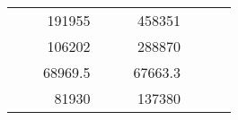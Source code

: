 \begin{table}[H]
\begin{tabular}{|ccrccrccc}
\multicolumn{1}{|c|}{\cellcolor[HTML]{FFFFC7}}                                & \multicolumn{1}{c|}{\cellcolor[HTML]{DDFDFF}}                      & \multicolumn{1}{r|}{\cellcolor[HTML]{DAE8FC}191955}    & \multicolumn{1}{c|}{\cellcolor[HTML]{FFFFC7}}                                & \multicolumn{1}{c|}{\cellcolor[HTML]{DDFDFF}}                       & \multicolumn{1}{r|}{\cellcolor[HTML]{DDFDFF}458351}    &                                                                              &                                                                    &                                                        \\ \cline{3-3} \cline{6-6}
\multicolumn{1}{|c|}{\cellcolor[HTML]{FFFFC7}}                                & \multicolumn{1}{c|}{\cellcolor[HTML]{DDFDFF}}                      & \multicolumn{1}{r|}{\cellcolor[HTML]{DDFDFF}106202}    & \multicolumn{1}{c|}{\cellcolor[HTML]{FFFFC7}}                                & \multicolumn{1}{c|}{\cellcolor[HTML]{DDFDFF}}                       & \multicolumn{1}{r|}{\cellcolor[HTML]{DAE8FC}288870}    &                                                                              &                                                                    &                                                        \\ \cline{3-3} \cline{6-6}
\multicolumn{1}{|c|}{\cellcolor[HTML]{FFFFC7}}                                & \multicolumn{1}{c|}{\cellcolor[HTML]{DDFDFF}}                      & \multicolumn{1}{r|}{\cellcolor[HTML]{DAE8FC}68969.5}   & \multicolumn{1}{c|}{\cellcolor[HTML]{FFFFC7}}                                & \multicolumn{1}{c|}{\cellcolor[HTML]{DDFDFF}}                       & \multicolumn{1}{r|}{\cellcolor[HTML]{DDFDFF}67663.3}   &                                                                              &                                                                    &                                                        \\ \cline{3-3} \cline{6-6}
\multicolumn{1}{|c|}{\cellcolor[HTML]{FFFFC7}}                                & \multicolumn{1}{c|}{\cellcolor[HTML]{DDFDFF}}                      & \multicolumn{1}{r|}{\cellcolor[HTML]{DDFDFF}81930}     & \multicolumn{1}{c|}{\cellcolor[HTML]{FFFFC7}}                                & \multicolumn{1}{c|}{\cellcolor[HTML]{DDFDFF}}                       & \multicolumn{1}{r|}{\cellcolor[HTML]{DAE8FC}137380}    &                                                                              &                                                                    &                                                        \\ \cline{3-3} \cline{6-6}

\end{tabular}
\end{table}
